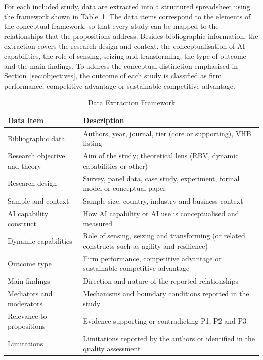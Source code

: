 \label{sec:data-extraction}For each included study, data are extracted into a structured spreadsheet using the framework shown in Table~\ref{tab:extraction}. The data items correspond to the elements of the conceptual framework, so that every study can be mapped to the relationships that the propositions address. Besides bibliographic information, the extraction covers the research design and context, the conceptualisation of AI capabilities, the role of sensing, seizing and transforming, the type of outcome and the main findings. To address the conceptual distinction emphasised in Section~\ref{sec:objectives}, the outcome of each study is classified as firm performance, competitive advantage or sustainable competitive advantage.

\begin{table}[H]
  \centering
  \caption{Data Extraction Framework}
  \label{tab:extraction}
  \small{}
  \begin{tabularx}{\textwidth}{>{\raggedright\arraybackslash}p{4.2cm}>{\raggedright\arraybackslash}X}
    \toprule
    \textbf{Data item} & \textbf{Description} \\
    \midrule
    Bibliographic data & Authors, year, journal, tier (core or supporting), VHB listing \\
    \addlinespace
    Research objective and theory & Aim of the study; theoretical lens (RBV, dynamic capabilities or other) \\
    \addlinespace
    Research design & Survey, panel data, case study, experiment, formal model or conceptual paper \\
    \addlinespace
    Sample and context & Sample size, country, industry and business context \\
    \addlinespace
    AI capability construct & How AI capability or AI use is conceptualised and measured \\
    \addlinespace
    Dynamic capabilities & Role of sensing, seizing and transforming (or related constructs such as agility and resilience) \\
    \addlinespace
    Outcome type & Firm performance, competitive advantage or sustainable competitive advantage \\
    \addlinespace
    Main findings & Direction and nature of the reported relationships \\
    \addlinespace
    Mediators and moderators & Mechanisms and boundary conditions reported in the study \\
    \addlinespace
    Relevance to propositions & Evidence supporting or contradicting P1, P2 and P3 \\
    \addlinespace
    Limitations & Limitations reported by the authors or identified in the quality assessment \\
    \bottomrule
  \end{tabularx}
\end{table}

